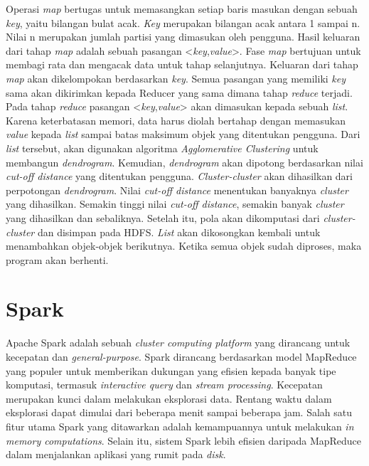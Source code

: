 Operasi \textit{map} bertugas untuk memasangkan setiap baris masukan dengan sebuah \textit{key}, yaitu bilangan bulat acak. \textit{Key} merupakan bilangan acak antara 1 sampai n. Nilai n merupakan jumlah partisi yang dimasukan oleh pengguna. Hasil keluaran dari tahap \textit{map} adalah sebuah pasangan <\textit{key},\textit{value}>. Fase \textit{map} bertujuan untuk membagi rata dan mengacak data untuk tahap selanjutnya. Keluaran dari tahap \textit{map} akan dikelompokan berdasarkan \textit{key}. Semua pasangan yang memiliki \textit{key} sama akan dikirimkan kepada Reducer yang sama dimana tahap \textit{reduce} terjadi.\\

Pada tahap \textit{reduce} pasangan <\textit{key},\textit{value}> akan dimasukan kepada sebuah \textit{list}. Karena keterbatasan memori, data harus diolah bertahap dengan memasukan \textit{value} kepada \textit{list} sampai batas maksimum objek yang ditentukan pengguna. Dari \textit{list} tersebut, akan digunakan algoritma \textit{Agglomerative Clustering} untuk membangun \textit{dendrogram}. Kemudian, \textit{dendrogram} akan dipotong berdasarkan nilai \textit{cut-off distance} yang ditentukan pengguna. \textit{Cluster-cluster} akan dihasilkan dari perpotongan \textit{dendrogram}. Nilai \textit{cut-off distance} menentukan banyaknya \textit{cluster} yang dihasilkan. Semakin tinggi nilai \textit{cut-off distance}, semakin banyak \textit{cluster} yang dihasilkan dan sebaliknya. Setelah itu, pola akan dikomputasi dari \textit{cluster-cluster} dan disimpan pada HDFS. \textit{List} akan dikosongkan kembali untuk menambahkan objek-objek berikutnya. Ketika semua objek sudah diproses, maka program akan berhenti.


\section{Spark~\cite{holdenkarau:07:ls}}

Apache Spark adalah sebuah \textit{cluster computing platform} yang dirancang untuk kecepatan dan \textit{general-purpose}. Spark dirancang berdasarkan model MapReduce yang populer untuk memberikan dukungan yang efisien kepada banyak tipe komputasi, termasuk \textit{interactive query} dan \textit{stream processing}. Kecepatan merupakan kunci dalam melakukan eksplorasi data. Rentang waktu dalam eksplorasi dapat dimulai dari beberapa menit sampai beberapa jam. Salah satu fitur utama Spark yang ditawarkan adalah kemampuannya untuk melakukan \textit{in memory computations}. Selain itu, sistem Spark lebih efisien daripada MapReduce dalam menjalankan aplikasi yang rumit pada \textit{disk}.\\


